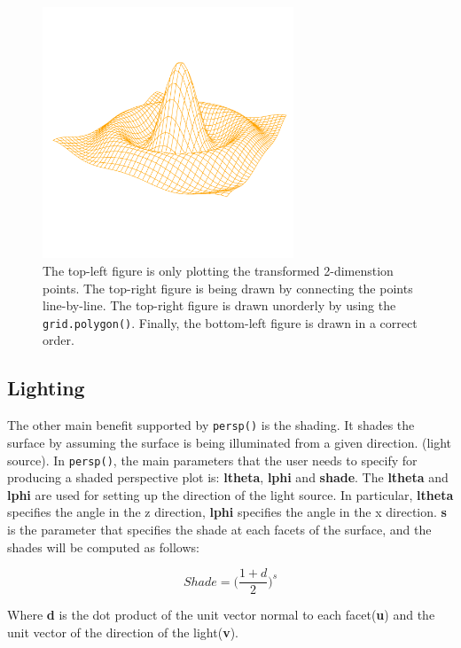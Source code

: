 \documentclass[11pt]{report}
\begin{document}
\begin{figure}[h]
\begin{center}
		\includegraphics[height = 7.5cm, width = 7.5cm]{figure/standalone_p_4.pdf}
		\caption{The top-left figure is only plotting the transformed 2-dimenstion points. The top-right figure is being drawn by connecting the points line-by-line. The top-right figure is drawn unorderly by using the \texttt{grid.polygon()}. Finally, the bottom-left figure is drawn in a correct order.}
		\label{figure_3.2}
	\end{center}
\end{figure}

\subsection{Lighting}
The other main benefit supported by \texttt{persp()} is the shading. It shades the surface by assuming the surface is being illuminated from a given direction. (light source). In \texttt{persp()}, the main parameters that the user needs to specify for producing a shaded perspective plot is: \textbf{ltheta}, \textbf{lphi} and \textbf{shade}. The \textbf{ltheta} and \textbf{lphi} are used for setting up the direction of the light source. In particular, \textbf{ltheta} specifies the angle in the z direction, \textbf{lphi} specifies the angle in the x direction. \textbf{s} is the parameter that specifies the shade at each facets of the surface, and the shades will be computed as follows:

\begin{equation}
Shade = \big(\frac{1 + d}{2}\big)^{s}
\end{equation}

Where \textbf{d} is the dot product of the unit vector normal to each facet(\textbf{u}) and the unit vector of the direction of the light(\textbf{v}). \\
\end{document}
